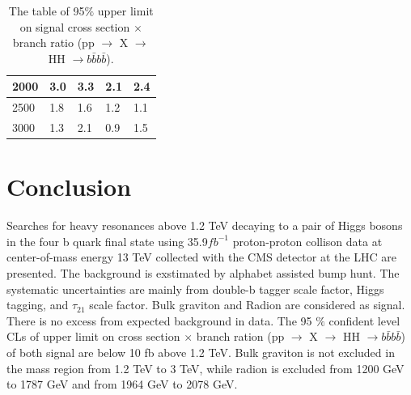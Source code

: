 \begin{table}[]
\begin{tabular}{|l|l|l|l|l|}
2000                                                    & 3.0                                                       & 3.3                                                       & 2.1                                                              & 2.4                                                               \\ \hline
2500                                                    & 1.8                                                       & 1.6                                                       & 1.2                                                              & 1.1                                                               \\ \hline
3000                                                    & 1.3                                                       & 2.1                                                       & 0.9                                                              & 1.5                                                               \\ \hline
\end{tabular}
\caption{The table of 95$\% $ upper limit on signal cross section $\times $ branch ratio (pp $\rightarrow$ X $\rightarrow$ HH $\rightarrow b\bar{b}b\bar{b}$).}
\end{table}

\section{Conclusion}
Searches for heavy resonances above 1.2 TeV decaying to a pair of Higgs
bosons in the four b quark final state using 35.9$fb^{-1}$ proton-proton collison data at center-of-mass energy 13 TeV collected with the CMS detector at the LHC are presented. The background is exstimated by alphabet assisted bump hunt. The systematic uncertainties are mainly from double-b tagger scale factor, Higgs tagging, and $\tau_{21}$ scale factor. Bulk graviton and Radion are considered as signal. There is no excess from expected background in data. The 95 $\% $ confident level CLs of upper limit on cross section $\times$ branch ration (pp $\rightarrow$ X $\rightarrow$ HH $\rightarrow b\bar{b}b\bar{b}$) of both signal are below 10 fb above 1.2 TeV. Bulk graviton is not excluded in the mass region from 1.2 TeV to 3 TeV, while radion is excluded from 1200 GeV to 1787 GeV and from 1964 GeV to 2078 GeV. 
 